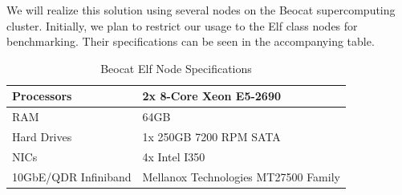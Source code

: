 \documentclass[letterpaper, 12pt]{article}
\begin{document}
\begin{flushleft}
We will realize this solution using several nodes on the Beocat supercomputing cluster.  Initially, we plan to restrict our usage to the Elf class nodes for benchmarking. Their specifications can be seen in the accompanying table.
~\newline

\begin{table}[ht]
	\centering
	\caption{Beocat Elf Node Specifications}
	\label{nodespecs}
	\begin{tabular}{|l|l|}
		\hline
		Processors           & 2x 8-Core Xeon E5-2690               \\ \hline
		RAM                  & 64GB                                 \\ \hline
		Hard Drives          & 1x 250GB 7200 RPM SATA               \\ \hline
		NICs                 & 4x Intel I350                        \\ \hline
		10GbE/QDR Infiniband & Mellanox Technologies MT27500 Family \\ \hline
	\end{tabular}
\end{table}


\end{flushleft}
\end{document}
